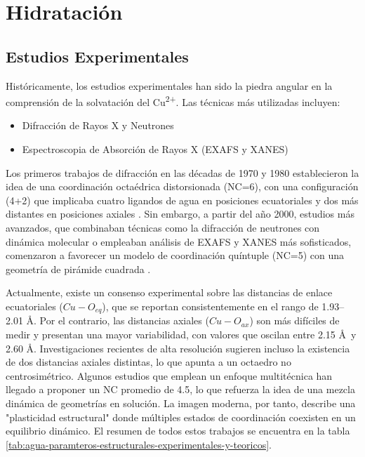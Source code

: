 \section{Hidratación}

\subsection*{Estudios Experimentales}

Históricamente, los estudios experimentales han sido la piedra angular en la comprensión de la solvatación del Cu\textsuperscript{2+}. Las técnicas más utilizadas incluyen:
\begin{itemize}
    \item Difracción de Rayos X y Neutrones
    \item Espectroscopia de Absorción de Rayos X (EXAFS y XANES)
\end{itemize}

Los primeros trabajos de difracción en las décadas de 1970 y 1980 establecieron la idea de una coordinación octaédrica distorsionada (NC=6), con una configuración (4+2) que implicaba cuatro ligandos de agua en posiciones ecuatoriales y dos más distantes en posiciones axiales \cite{Wa-1988-01}. Sin embargo, a partir del año 2000, estudios más avanzados, que combinaban técnicas como la difracción de neutrones con dinámica molecular o empleaban análisis de EXAFS y XANES más sofisticados, comenzaron a favorecer un modelo de coordinación quíntuple (NC=5) con una geometría de pirámide cuadrada \cite{Wa-2001-01, Wa-2002-01}.

Actualmente, existe un consenso experimental sobre las distancias de enlace ecuatoriales ($Cu-O_{eq}$), que se reportan consistentemente en el rango de 1.93--2.01 \AA. Por el contrario, las distancias axiales ($Cu-O_{ax}$) son más difíciles de medir y presentan una mayor variabilidad, con valores que oscilan entre 2.15 \AA \ y 2.60 \AA. Investigaciones recientes de alta resolución sugieren incluso la existencia de dos distancias axiales distintas, lo que apunta a un octaedro no centrosimétrico. Algunos estudios que emplean un enfoque multitécnica han llegado a proponer un NC promedio de 4.5, lo que refuerza la idea de una mezcla dinámica de geometrías en solución. La imagen moderna, por tanto, describe una "plasticidad estructural" donde múltiples estados de coordinación coexisten en un equilibrio dinámico. El resumen de todos estos trabajos se encuentra en la tabla \ref{tab:agua-paramteros-estructurales-experimentales-y-teoricos}.

